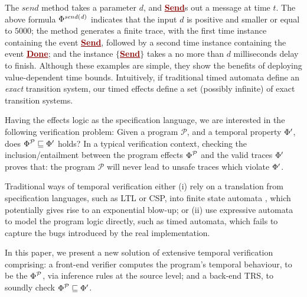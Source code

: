 \documentclass[acmsmall,review,anonymous]{acmart}\settopmatter{printfolios=true,printccs=false,printacmref=false}
\newcommand{\effect}{\textcolor{black}{\ensuremath{\mathrm{\Phi}}}}
\newcommand{\anyevent}[1]{{\textcolor{darkred}
{\underline{\textbf{\footnotesize #1}}}}}
\newcommand{\code}[1]{{\tt{\ensuremath{\m{#1}}}}}
\newcommand{\CONTAIN}{\sqsubseteq}
\newcommand{\m}{\mathit}
\begin{document}
The \code{send} method takes a parameter \code{d}, and \anyevent{Send}s out a message at time \code{t}.  
The above formula  \code{\effect^{send (d)}} indicates that the input  \code{d} is positive and smaller or equal to \code{5000}; the method generates a finite trace, with the first time instance containing the event \anyevent{Send}, followed by a second time instance containing the event \anyevent{Done}; and the instance \code{\{}\anyevent{Send}\code{\}} takes a no more than \code{d} milliseconds delay to finish. 
Although these examples are simple, they show the benefits of deploying value-dependent time bounds. Intuitively, if traditional timed automata \cite{larsen1997uppaal} define an \emph{exact} transition system, our timed effects define a set (possibly infinite) of exact transition systems. 



 
   






Having the effects logic as the specification language, we are interested in the following verification problem: 
Given a program \code{\mathcal{P}}, and a temporal property \code{\effect^{\prime}}, does \code{\effect^{\mathcal{P}} \CONTAIN \effect^{\prime}} holds? In a typical verification
context, checking the inclusion/entailment between the program effects \code{\effect^{\mathcal{P}}} and the valid traces \code{\effect^{\prime}} proves that: the program \code{\mathcal{P}} will never lead to unsafe traces which violate \code{\effect^{\prime}}.


Traditional ways of temporal verification either (i) rely on a translation from specification languages, such as LTL or CSP, into finite state automata \cite{sun2009pat}, which potentially gives rise to an exponential blow-up; %
or (ii) use expressive automata to model the program logic directly, such as timed automata, which fails to capture the bugs introduced by the real implementation. 

In this paper, we present a new solution of extensive temporal verification comprising: a front-end verifier computes the program's  temporal behaviour, to be the \code{\effect^{\mathcal{P}}}, via inference rules at the source level; %
and a back-end TRS, to soundly check \code{\effect^{\mathcal{P}} \CONTAIN \effect^{\prime}}. 
\end{document}
